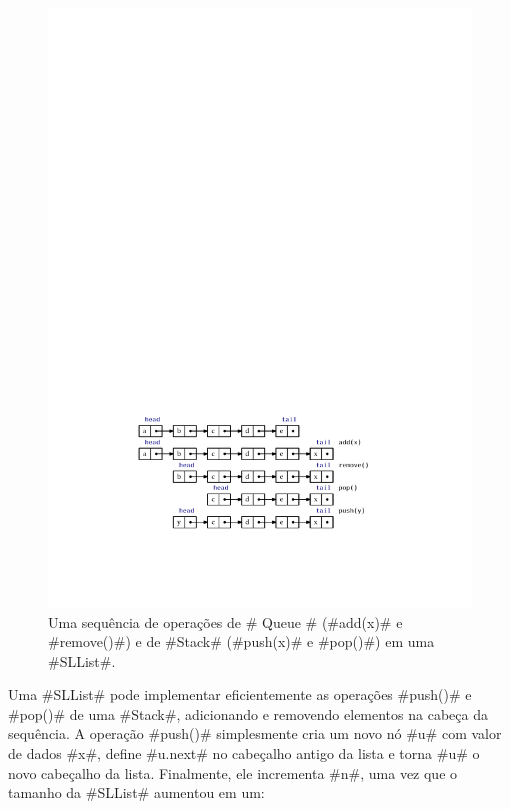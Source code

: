 \begin{figure}
  \begin{center}
    \includegraphics[width=\ScaleIfNeeded]{figs/sllist}
  \end{center}
  \caption[Uma sequência de operações de fila e pilha em uma SLList] {Uma sequência de operações de # Queue # 
  	(#add(x)# e #remove()#) e de #Stack# (#push(x)# e #pop()#) em uma #SLList#.}
\end{figure}

Uma #SLList# pode implementar eficientemente as operações #push()# e #pop()# 
de uma #Stack#, adicionando e removendo elementos na cabeça da sequência. 
A operação #push()# simplesmente cria um novo nó #u# com valor de dados #x#, 
define #u.next# no cabeçalho antigo da lista e torna #u# o novo cabeçalho 
da lista. Finalmente, ele incrementa #n#, uma vez que o tamanho da #SLList# 
aumentou em um:

